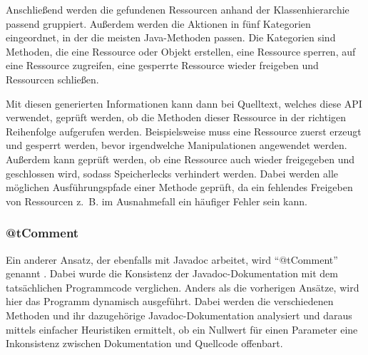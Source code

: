 Anschließend werden die gefundenen Ressourcen anhand der Klassenhierarchie passend gruppiert. Außerdem werden die Aktionen in fünf Kategorien eingeordnet, in der die meisten Java-Methoden passen. Die Kategorien sind Methoden, die eine Ressource oder Objekt erstellen, eine Ressource sperren, auf eine Ressource zugreifen, eine gesperrte Ressource wieder freigeben und Ressourcen schließen. 

Mit diesen generierten Informationen kann dann bei Quelltext, welches diese API verwendet, geprüft werden, ob die Methoden dieser Ressource in der richtigen Reihenfolge aufgerufen werden. Beispielsweise muss eine Ressource zuerst erzeugt und gesperrt werden, bevor irgendwelche Manipulationen angewendet werden. Außerdem kann geprüft werden, ob eine Ressource auch wieder freigegeben und geschlossen wird, sodass Speicherlecks verhindert werden. Dabei werden alle möglichen Ausführungspfade einer Methode geprüft, da ein fehlendes Freigeben von Ressourcen z.~B. im Ausnahmefall ein häufiger Fehler sein kann. 

\subsubsection{@tComment}\label{@tComment}
Ein anderer Ansatz, der ebenfalls mit Javadoc arbeitet, wird \enquote{@tComment} genannt \cite[S. 1ff.]{@tComment:TestingJavadocCommentstoDetectComment-CodeInconsistencies}. Dabei wurde die Konsistenz der Javadoc-Dokumentation mit dem tatsächlichen Programmcode verglichen. Anders als die vorherigen Ansätze, wird hier das Programm dynamisch ausgeführt. Dabei werden die verschiedenen Methoden und ihr dazugehörige Javadoc-Dokumentation analysiert und daraus mittels einfacher Heuristiken ermittelt, ob ein  Nullwert für einen Parameter eine Inkonsistenz zwischen Dokumentation und Quellcode offenbart.

